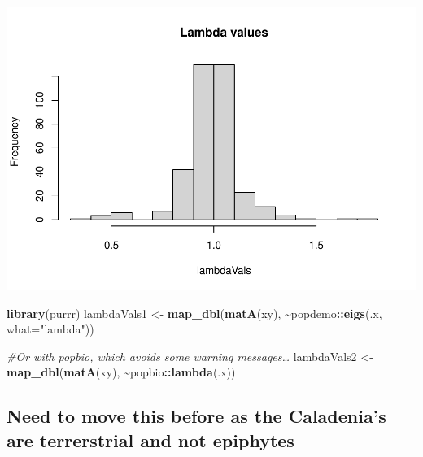 \documentclass[
]{book}
\newenvironment{Shaded}{\begin{snugshade}}{\end{snugshade}}
\newcommand{\AttributeTok}[1]{\textcolor[rgb]{0.13,0.29,0.53}{#1}}
\newcommand{\CommentTok}[1]{\textcolor[rgb]{0.56,0.35,0.01}{\textit{#1}}}
\newcommand{\FunctionTok}[1]{\textcolor[rgb]{0.13,0.29,0.53}{\textbf{#1}}}
\newcommand{\NormalTok}[1]{#1}
\newcommand{\OtherTok}[1]{\textcolor[rgb]{0.56,0.35,0.01}{#1}}
\newcommand{\SpecialCharTok}[1]{\textcolor[rgb]{0.81,0.36,0.00}{\textbf{#1}}}
\newcommand{\StringTok}[1]{\textcolor[rgb]{0.31,0.60,0.02}{#1}}
\theoremstyle{definition}
\theoremstyle{definition}
\theoremstyle{definition}
\theoremstyle{definition}
\theoremstyle{remark}
\begin{document}
\includegraphics{Diagnostico_Poblacional_files/figure-latex/chap16_17-1.pdf}

\begin{Shaded}
\begin{Highlighting}[]
\FunctionTok{library}\NormalTok{(purrr)}
\NormalTok{lambdaVals1 }\OtherTok{\textless{}{-}} \FunctionTok{map\_dbl}\NormalTok{(}\FunctionTok{matA}\NormalTok{(xy), }\SpecialCharTok{\textasciitilde{}}\NormalTok{popdemo}\SpecialCharTok{::}\FunctionTok{eigs}\NormalTok{(.x, }\AttributeTok{what=}\StringTok{"lambda"}\NormalTok{))}
 
 
\CommentTok{\#Or with popbio, which avoids some warning messages…}
\NormalTok{lambdaVals2 }\OtherTok{\textless{}{-}} \FunctionTok{map\_dbl}\NormalTok{(}\FunctionTok{matA}\NormalTok{(xy), }\SpecialCharTok{\textasciitilde{}}\NormalTok{popbio}\SpecialCharTok{::}\FunctionTok{lambda}\NormalTok{(.x))}
\end{Highlighting}
\end{Shaded}

\subsection{Need to move this before as the Caladenia's are terrerstrial and not epiphytes}\label{need-to-move-this-before-as-the-caladenias-are-terrerstrial-and-not-epiphytes}
\end{document}
